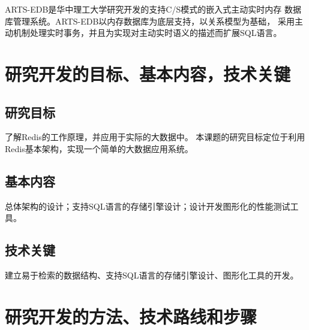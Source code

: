 \documentclass[proposal]{zjutreport}
\begin{document}
ARTS-EDB是华中理工大学研究开发的支持C/S模式的嵌入式主动实时内存
数据库管理系统。ARTS-EDB以内存数据库为底层支持，以关系模型为基础，
采用主动机制处理实时事务，并且为实现对主动实时语义的描述而扩展SQL语言。

\chapter{研究开发的目标、基本内容，技术关键}
\section{研究目标}
了解Redis的工作原理，并应用于实际的大数据中。
本课题的研究目标定位于利用Redis基本架构，实现一个简单的大数据应用系统。

\section{基本内容}
总体架构的设计；支持SQL语言的存储引擎设计；设计开发图形化的性能测试工具。

\section{技术关键}
建立易于检索的数据结构、支持SQL语言的存储引擎设计、图形化工具的开发。

\chapter{研究开发的方法、技术路线和步骤}
\end{document}
